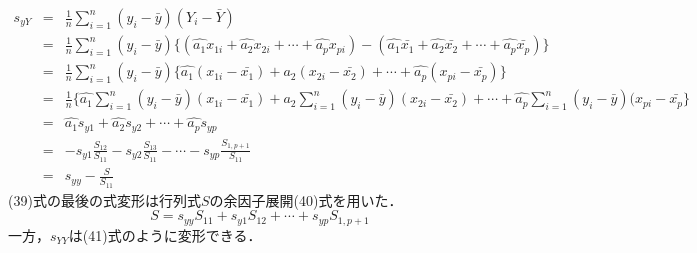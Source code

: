 \documentclass[dvipdfmx]{jsarticle}
\begin{document}
\begin{eqnarray}
  s_{yY}&=&\frac{1}{n}\sum_{i=1}^n (y_i-\bar{y})(Y_i-\bar{Y}) \nonumber \\
  &=& \frac{1}{n}\sum_{i=1}^n (y_i-\bar{y}) \{(\hat{a_1}x_{1i}+\hat{a_2}x_{2i}+\cdots+\hat{a_p}x_{pi})-(\hat{a_1}\bar{x_1}+\hat{a_2}\bar{x_2}+\cdots+\hat{a_p}\bar{x_p})\} \nonumber \\
  &=&\frac{1}{n}\sum_{i=1}^n(y_i-\bar{y})\{\hat{a_1}(x_{1i}-\bar{x_1})+\hat{a_2}(x_{2i}-\bar{x_2})+\cdots +\hat{a_p}(x_{pi}-\bar{x_p})\}\nonumber \\
  &=&\frac{1}{n}\{\hat{a_1}\sum_{i=1}^n(y_i-\bar{y})(x_{1i}-\bar{x_1})+\hat{a_2}\sum_{i=1}^n(y_i-\bar{y})(x_{2i}-\bar{x_2})+\cdots +\hat{a_p}\sum_{i=1}^n(y_i-\bar{y})(x_{pi}-\bar{x_p}\}\nonumber \\
  &=&\hat{a_1}s_{y1}+\hat{a_2}s_{y2}+\cdots+\hat{a_p}s_{yp} \nonumber \\
  &=&-s_{y1}\frac{S_{12}}{S_{11}}-s_{y2}\frac{S_{13}}{S_{11}}-\cdots-s_{yp}\frac{S_{1,p+1}}{S_{11}} \nonumber \\
  &=&s_{yy}-\frac{S}{S_{11}}
\end{eqnarray}
(39)式の最後の式変形は行列式$S$の余因子展開(40)式を用いた．
\begin{equation}
  S=s_{yy}S_{11}+s_{y1}S_{12}+\cdots+s_{yp}S_{1,p+1}
\end{equation}
一方，$s_{YY}$は(41)式のように変形できる．
\end{document}
